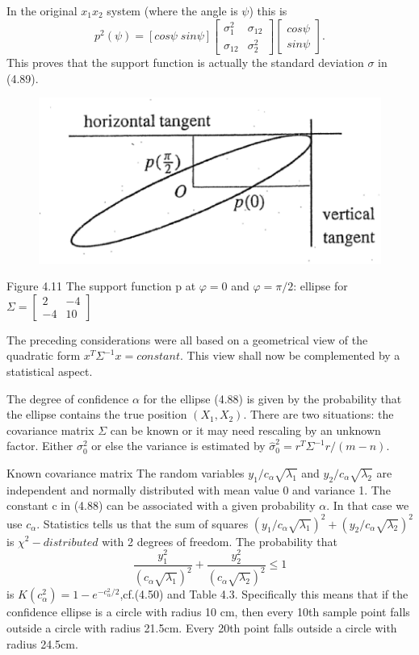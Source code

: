 	In the original $x_1x_2$ system (where the angle is $\psi$) this is
	\begin{equation}
	p^2(\psi)=[cos\psi\;sin\psi]
	\begin{bmatrix}
	\sigma^2_1 & \sigma_{12}\\ \sigma_{12} & \sigma^2_2
	\end{bmatrix}
	\begin{bmatrix}
	cos\psi \\ sin\psi
	\end{bmatrix}.
	\end{equation}
	This proves that the support function is actually the standard deviation $\sigma$ in (4.89).
	
	\begin{figure}[h]
		\centering
		\includegraphics[width=0.7\linewidth]{TeX_files/Part02/chapter04/image/4-11}
		\caption{}
		\label{fig:4-11}
	\end{figure}
	Figure 4.11\; The support function p at $\varphi=0$ and $\varphi=\pi/2$: ellipse for $\Sigma=\begin{bmatrix}
	2 & -4 \\ -4 & 10 \end{bmatrix}$
	
	The preceding considerations were all based on a geometrical view of the quadratic form
	$x^T\Sigma^{-1}x=constant$. This view shall now be complemented by a statistical aspect.
	
	The degree of confidence $\alpha$ for the ellipse (4.88) is given by the probability that
	the ellipse contains the true position $(X_1,X_2)$. There are two situations: the covariance
	matrix $\Sigma$ can be known or it may need rescaling by an unknown factor. Either $\sigma^2_0$ or else the variance is estimated by $\hat{\sigma}^2_0=r^T\Sigma^{-1}r/(m-n)$.
	
	Known covariance matrix The random variables $y_1/c_\alpha\sqrt{\lambda_1}$ and $y_2/c_\alpha\sqrt{\lambda_2}$ are independent and normally distributed with mean value 0 and variance 1. The constant c in (4.88) can be associated with a given probability $\alpha$. In that case we use $c_\alpha$. Statistics tells us that the sum of squares $(y_1/c_\alpha\sqrt{\lambda_1})^2+(y_2/c_\alpha\sqrt{\lambda_2})^2$ is $\chi^2-distributed$ with 2 degrees of freedom. The probability that
	\begin{equation}
	\frac{y^2_1}{(c_\alpha \sqrt{\lambda_1})^2}+\frac{y^2_2}{(c_\alpha \sqrt{\lambda_2})^2}\leq 1
	\end{equation}
	is $K(c^2_\alpha)=1-e^{-c^2_\alpha/2}$,cf.(4.50) and Table 4.3. Specifically this means that if the confidence ellipse is a circle with radius 10 cm, then every 10th sample point falls outside a circle with radius 21.5cm. Every 20th point falls outside a circle with radius 24.5cm.
	
